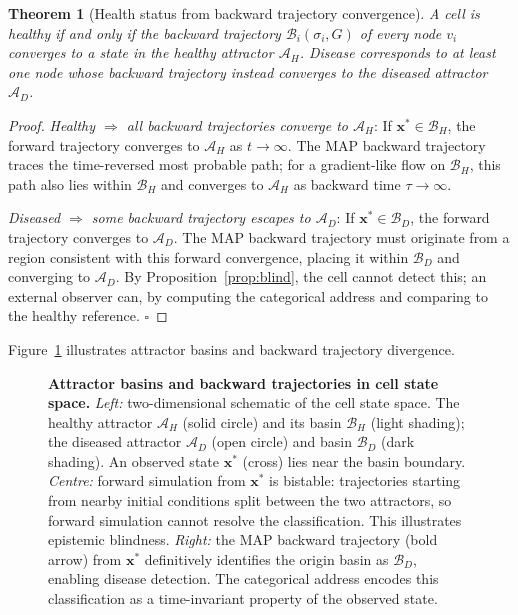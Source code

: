 \documentclass[twocolumn,10pt,a4paper]{article}
\newcommand{\Back}{\mathcal{B}}
\newtheorem{theorem}{Theorem}[section]
\begin{document}
\begin{theorem}[Health status from backward trajectory convergence]
\label{thm:health-address}
A cell is healthy if and only if the backward trajectory $\Back_i(\sigma_i,G)$
of every node $v_i$ converges to a state in the healthy attractor
$\mathcal{A}_H$.  Disease corresponds to at least one node whose backward
trajectory instead converges to the diseased attractor $\mathcal{A}_D$.
\end{theorem}

\begin{proof}
\emph{Healthy $\Rightarrow$ all backward trajectories converge to $\mathcal{A}_H$}:
If $\mathbf{x}^*\in\mathcal{B}_H$, the forward trajectory converges to
$\mathcal{A}_H$ as $t\to\infty$.  The MAP backward trajectory traces the
time-reversed most probable path; for a gradient-like flow on $\mathcal{B}_H$,
this path also lies within $\mathcal{B}_H$ and converges to $\mathcal{A}_H$
as backward time $\tau\to\infty$.

\emph{Diseased $\Rightarrow$ some backward trajectory escapes to $\mathcal{A}_D$}:
If $\mathbf{x}^*\in\mathcal{B}_D$, the forward trajectory converges to
$\mathcal{A}_D$.  The MAP backward trajectory must originate from a region
consistent with this forward convergence, placing it within $\mathcal{B}_D$
and converging to $\mathcal{A}_D$.  By Proposition~\ref{prop:blind}, the cell
cannot detect this; an external observer can, by computing the categorical
address and comparing to the healthy reference.  $\square$
\end{proof}

Figure~\ref{fig:attractors} illustrates attractor basins and backward
trajectory divergence.

\begin{figure}[t]
\centering
\fbox{\rule{0pt}{4.5cm}\rule{15cm}{0pt}}
\caption{\textbf{Attractor basins and backward trajectories in cell state
space.}  \emph{Left:} two-dimensional schematic of the cell state space.  The
healthy attractor $\mathcal{A}_H$ (solid circle) and its basin $\mathcal{B}_H$
(light shading); the diseased attractor $\mathcal{A}_D$ (open circle) and
basin $\mathcal{B}_D$ (dark shading).  An observed state $\mathbf{x}^*$ (cross)
lies near the basin boundary.  \emph{Centre:} forward simulation from
$\mathbf{x}^*$ is bistable: trajectories starting from nearby initial
conditions split between the two attractors, so forward simulation cannot
resolve the classification.  This illustrates epistemic blindness.
\emph{Right:} the MAP backward trajectory (bold arrow) from $\mathbf{x}^*$
definitively identifies the origin basin as $\mathcal{B}_D$, enabling
disease detection.  The categorical address encodes this classification as a
time-invariant property of the observed state.}
\label{fig:attractors}
\end{figure}
\end{document}
